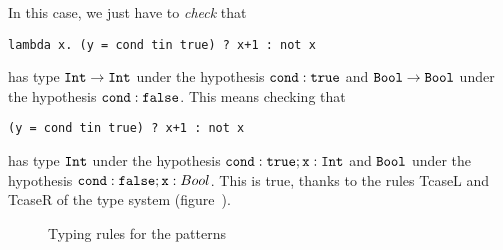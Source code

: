 In this case, we just have to \emph{check} that
\begin{lstlisting}[language=NLight]
lambda x. (y = cond tin true) ? x+1 : not x
\end{lstlisting}
has type $\texttt{Int} \rightarrow \texttt{Int}$ under the hypothesis $\texttt{cond} :
\texttt{true}$ and $\texttt{Bool} \rightarrow \texttt{Bool}$ under the hypothesis
$\texttt{cond} : \texttt{false}$. This means checking that
\begin{lstlisting}[language=NLight]
(y = cond tin true) ? x+1 : not x
\end{lstlisting}
has type $\texttt{Int}$ under the hypothesis $\texttt{cond} : \texttt{true}; \texttt{x}
: \texttt{Int}$ and $\texttt{Bool}$ under the hypothesis $\texttt{cond} : \texttt{false};
\texttt{x} : Bool$. This is true, thanks to the rules TcaseL and TcaseR of the
type system (figure~).

\begin{figure}
  \caption{Typing rules for the patterns\label{typing::patterns::typing-rules}}
\end{figure}

